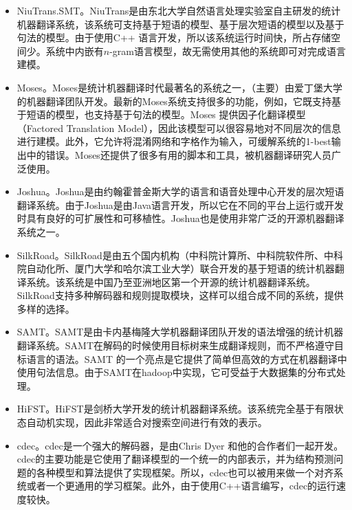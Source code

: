 \begin{appendices}
\begin{itemize}
\vspace{0.5em}
\item NiuTrans.SMT。NiuTrans是由东北大学自然语言处理实验室自主研发的统计机器翻译系统，该系统可支持基于短语的模型、基于层次短语的模型以及基于句法的模型。由于使用C++ 语言开发，所以该系统运行时间快，所占存储空间少。系统中内嵌有$n$-gram语言模型，故无需使用其他的系统即可对完成语言建模。
\vspace{0.5em}
\item Moses。Moses是统计机器翻译时代最著名的系统之一，（主要）由爱丁堡大学的机器翻译团队开发。最新的Moses系统支持很多的功能，例如，它既支持基于短语的模型，也支持基于句法的模型。Moses 提供因子化翻译模型（Factored Translation Model），因此该模型可以很容易地对不同层次的信息进行建模。此外，它允许将混淆网络和字格作为输入，可缓解系统的1-best输出中的错误。Moses还提供了很多有用的脚本和工具，被机器翻译研究人员广泛使用。
\vspace{0.5em}
\item Joshua。Joshua是由约翰霍普金斯大学的语言和语音处理中心开发的层次短语翻译系统。由于Joshua是由Java语言开发，所以它在不同的平台上运行或开发时具有良好的可扩展性和可移植性。Joshua也是使用非常广泛的开源机器翻译系统之一。
\vspace{0.5em}
\item SilkRoad。SilkRoad是由五个国内机构（中科院计算所、中科院软件所、中科院自动化所、厦门大学和哈尔滨工业大学）联合开发的基于短语的统计机器翻译系统。该系统是中国乃至亚洲地区第一个开源的统计机器翻译系统。SilkRoad支持多种解码器和规则提取模块，这样可以组合成不同的系统，提供多样的选择。
\vspace{0.5em}
\item SAMT。SAMT是由卡内基梅隆大学机器翻译团队开发的语法增强的统计机器翻译系统。SAMT在解码的时候使用目标树来生成翻译规则，而不严格遵守目标语言的语法。SAMT 的一个亮点是它提供了简单但高效的方式在机器翻译中使用句法信息。由于SAMT在hadoop中实现，它可受益于大数据集的分布式处理。
\vspace{0.5em}
\item HiFST。HiFST是剑桥大学开发的统计机器翻译系统。该系统完全基于有限状态自动机实现，因此非常适合对搜索空间进行有效的表示。
\vspace{0.5em}
\item cdec。cdec是一个强大的解码器，是由Chris Dyer 和他的合作者们一起开发。cdec的主要功能是它使用了翻译模型的一个统一的内部表示，并为结构预测问题的各种模型和算法提供了实现框架。所以，cdec也可以被用来做一个对齐系统或者一个更通用的学习框架。此外，由于使用C++语言编写，cdec的运行速度较快。

\end{itemize}
\end{appendices}
